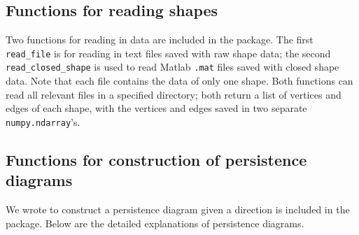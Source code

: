 \documentclass[codesnippet]{jss}
\begin{document}
\subsection{Functions for reading shapes}
Two functions for reading in data are included in the package. The first \texttt{read\_file} is for reading in text files saved with raw shape data; the second \texttt{read\_closed\_shape} is used to read Matlab \texttt{.mat} files saved with closed shape data. Note that each file contains the data of only one shape. Both functions can read all relevant files in a specified directory; both return a list of vertices and edges of each shape, with the vertices and edges saved in two separate \texttt{numpy.ndarray}'s.

\subsection{Functions for construction of persistence diagrams}
We wrote  to construct a persistence diagram given a direction is included in the package. Below are the detailed explanations of persistence diagrams.
\end{document}
